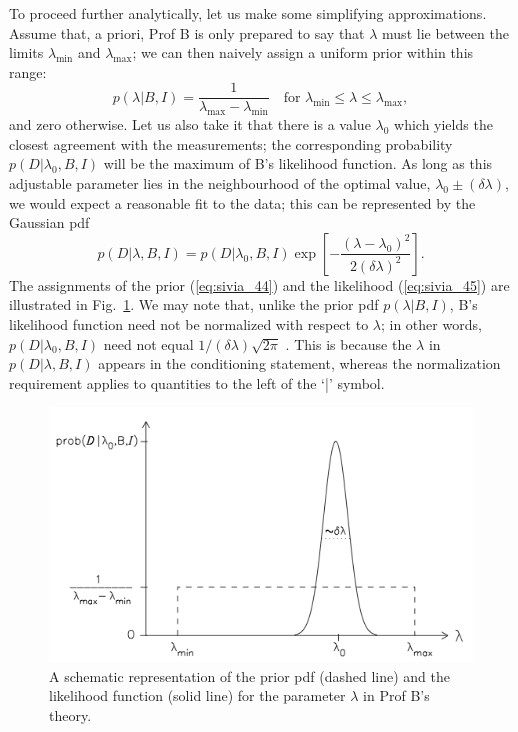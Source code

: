 \documentclass[%
oneside,                 %
final,                   %
10pt]{article}
\begin{document}
To proceed further analytically, let us make some simplifying approximations. Assume that, a priori, Prof B is only prepared to say that $\lambda$ must lie between the limits $\lambda_\mathrm{min}$ and $\lambda_\mathrm{max}$; we can then naively assign a uniform prior within this range:
\begin{equation}
p(\lambda|B,I) = \frac{1}{\lambda_\mathrm{max}-\lambda_\mathrm{min}} \quad \text{for } \lambda_\mathrm{min} \leq \lambda \leq \lambda_\mathrm{max}, 
\label{eq:sivia_44}
\end{equation}
and zero otherwise. Let us also take it that there is a value $\lambda_0$ which yields the closest agreement with the measurements; the corresponding probability $p(D|\lambda_0,B,I)$ will be the maximum of B’s likelihood function. As long as this adjustable parameter lies in the neighbourhood of the optimal value, $\lambda_0 \pm (\delta\lambda)$, we would expect a reasonable fit to the data; this can be represented by the Gaussian pdf
\begin{equation}
p(D|\lambda,B,I) = p(D|\lambda_0,B,I) \exp \left[ − \frac{(\lambda−\lambda_0)^2}{2(\delta\lambda)^2} \right]. 
\label{eq:sivia_45}
\end{equation}
The assignments of the prior (\ref{eq:sivia_44}) and the likelihood (\ref{eq:sivia_45}) are illustrated in Fig.~\ref{fig:sivia_41}. We may note that, unlike the prior pdf $p(\lambda|B,I)$, B’s likelihood function need not be normalized with respect to $\lambda$; in other words, $p(D|\lambda_0,B,I)$ need not equal $1/ (\delta\lambda) \sqrt{2\pi}$ . This is because the $\lambda$ in $p(D|\lambda,B,I)$ appears in the conditioning statement, whereas the normalization requirement applies to quantities to the left of the ‘|’ symbol.


\begin{figure}[!ht]  %
  \centerline{\includegraphics[width=0.8\linewidth]{fig/fig41.png}}
  \caption{
  A schematic representation of the prior pdf (dashed line) and the likelihood function (solid line) for the parameter $\lambda$ in Prof B’s theory. \label{fig:sivia_41}
  }
\end{figure}
\end{document}
